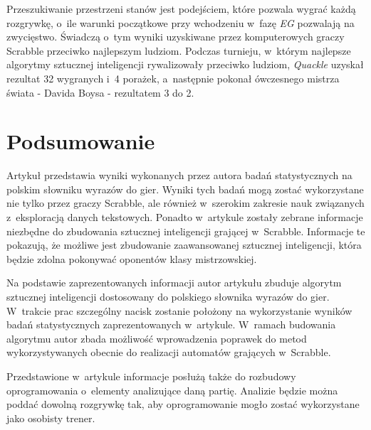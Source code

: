 \documentclass[a4paper,twocolumn,12pt]{article}
\theoremstyle{definition}
\begin{document}
Przeszukiwanie przestrzeni stanów jest podejściem, które pozwala wygrać każdą rozgrywkę, o~ile warunki początkowe przy wchodzeniu w~fazę \emph{EG} pozwalają na zwycięstwo. Świadczą o~tym wyniki uzyskiwane przez komputerowych graczy Scrabble przeciwko najlepszym ludziom. Podczas turnieju, w~którym najlepsze algorytmy sztucznej inteligencji rywalizowały przeciwko ludziom, \emph{Quackle} uzyskał rezultat 32 wygranych i~4 porażek, a~następnie pokonał ówczesnego mistrza świata - Davida Boysa - rezultatem 3 do 2. \cite{intelligent_game_playing}

\section*{Podsumowanie}

Artykuł przedstawia wyniki wykonanych przez autora badań statystycznych na polskim słowniku wyrazów do gier. Wyniki tych badań mogą zostać wykorzystane nie tylko przez graczy Scrabble, ale również w~szerokim zakresie nauk związanych z~eksploracją danych tekstowych. Ponadto w~artykule zostały zebrane informacje niezbędne do zbudowania sztucznej inteligencji grającej w~Scrabble. Informacje te pokazują, że możliwe jest zbudowanie zaawansowanej sztucznej inteligencji, która będzie zdolna pokonywać oponentów klasy mistrzowskiej.

Na podstawie zaprezentowanych informacji autor artykułu zbuduje algorytm sztucznej inteligencji dostosowany do polskiego słownika wyrazów do gier. W~trakcie prac szczególny nacisk zostanie położony na wykorzystanie wyników badań statystycznych zaprezentowanych w~artykule. W~ramach budowania algorytmu autor zbada możliwość wprowadzenia poprawek do metod wykorzystywanych obecnie do realizacji automatów grających w~Scrabble. 

Przedstawione w~artykule informacje posłużą także do rozbudowy oprogramowania o~elementy analizujące daną partię. Analizie będzie można poddać dowolną rozgrywkę tak, aby oprogramowanie mogło zostać wykorzystane jako osobisty trener. 
\end{document}
